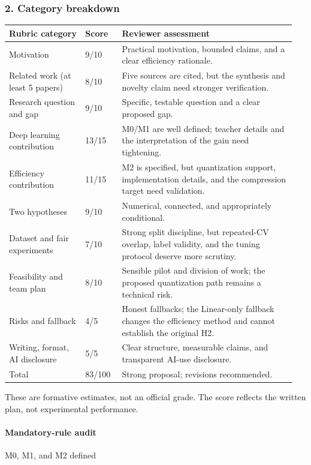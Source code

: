 \subsubsection*{2. Category breakdown}
\begin{small}\begin{tabular}{p{0.25\linewidth}p{0.12\linewidth}p{0.58\linewidth}}\toprule
\textbf{Rubric category} & \textbf{Score} & \textbf{Reviewer assessment} \\\midrule
Motivation & 9/10 & Practical motivation, bounded claims, and a clear efficiency rationale. \\
Related work (at least 5 papers) & 8/10 & Five sources are cited, but the synthesis and novelty claim need stronger verification. \\
Research question and gap & 9/10 & Specific, testable question and a clear proposed gap. \\
Deep learning contribution & 13/15 & M0/M1 are well defined; teacher details and the interpretation of the gain need tightening. \\
Efficiency contribution & 11/15 & M2 is specified, but quantization support, implementation details, and the compression target need validation. \\
Two hypotheses & 9/10 & Numerical, connected, and appropriately conditional. \\
Dataset and fair experiments & 7/10 & Strong split discipline, but repeated-CV overlap, label validity, and the tuning protocol deserve more scrutiny. \\
Feasibility and team plan & 8/10 & Sensible pilot and division of work; the proposed quantization path remains a technical risk. \\
Risks and fallback & 4/5 & Honest fallbacks; the Linear-only fallback changes the efficiency method and cannot establish the original H2. \\
Writing, format, AI disclosure & 5/5 & Clear structure, measurable claims, and transparent AI-use disclosure. \\
Total & 83/100 & Strong proposal; revisions recommended. \\
\bottomrule\end{tabular}\end{small}\par\medskip
These are formative estimates, not an official grade. The score reflects the written plan, not experimental performance.

\paragraph*{Mandatory-rule audit}
M0, M1, and M2 defined

